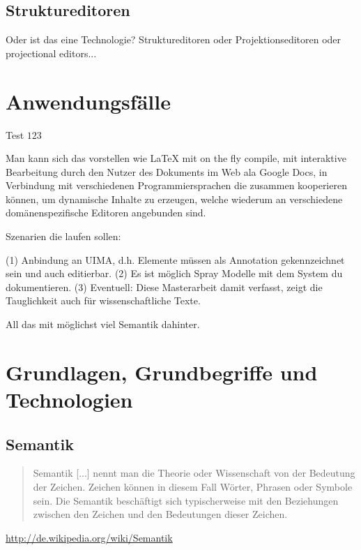 \section{Struktureditoren}

Oder ist das eine Technologie?
Struktureditoren oder Projektionseditoren oder projectional editors...



\chapter{Anwendungsfälle}



\citep{default}

Test $123$ \citep{6902013}

Man kann sich das vorstellen wie LaTeX mit on the fly compile,
mit interaktive Bearbeitung durch den Nutzer des Dokuments im Web ala
Google Docs, in Verbindung mit verschiedenen Programmiersprachen
die zusammen kooperieren können, um dynamische Inhalte zu erzeugen,
welche wiederum an verschiedene domänenspezifische Editoren angebunden sind.

Szenarien die laufen sollen:

(1) Anbindung an UIMA, d.h. Elemente müssen als Annotation gekennzeichnet sein
und auch editierbar.
(2) Es ist möglich Spray Modelle mit dem System du dokumentieren.
(3) Eventuell: Diese Masterarbeit damit verfasst, zeigt die Tauglichkeit
auch für wissenschaftliche Texte.

All das mit möglichst viel Semantik dahinter.

\chapter{Grundlagen, Grundbegriffe und Technologien}

\section{Semantik}

\begin{quote}Semantik [...] nennt man die Theorie oder Wissenschaft von der Bedeutung der Zeichen.
Zeichen können in diesem Fall Wörter, Phrasen oder Symbole sein. Die Semantik beschäftigt sich 
typischerweise mit den Beziehungen zwischen den Zeichen und den Bedeutungen dieser Zeichen.
\end{quote}
\url{http://de.wikipedia.org/wiki/Semantik}

